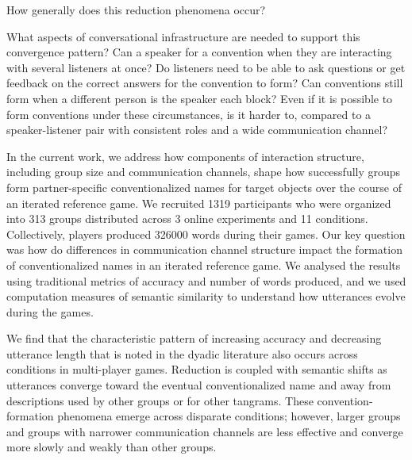 \documentclass[
  english,
  a4paper,
]{article}
\begin{document}
How generally does this reduction phenomena occur?

What aspects of conversational infrastructure are needed to support this convergence pattern? Can a speaker for a convention when they are interacting with several listeners at once? Do listeners need to be able to ask questions or get feedback on the correct answers for the convention to form? Can conventions still form when a different person is the speaker each block? Even if it is possible to form conventions under these circumstances, is it harder to, compared to a speaker-listener pair with consistent roles and a wide communication channel?

In the current work, we address how components of interaction structure, including group size and communication channels, shape how successfully groups form partner-specific conventionalized names for target objects over the course of an iterated reference game. We recruited 1319 participants who were organized into 313 groups distributed across 3 online experiments and 11 conditions. Collectively, players produced 326000 words during their games. Our key question was how do differences in communication channel structure impact the formation of conventionalized names in an iterated reference game. We analysed the results using traditional metrics of accuracy and number of words produced, and we used computation measures of semantic similarity to understand how utterances evolve during the games.

We find that the characteristic pattern of increasing accuracy and decreasing utterance length that is noted in the dyadic literature also occurs across conditions in multi-player games. Reduction is coupled with semantic shifts as utterances converge toward the eventual conventionalized name and away from descriptions used by other groups or for other tangrams. These convention-formation phenomena emerge across disparate conditions; however, larger groups and groups with narrower communication channels are less effective and converge more slowly and weakly than other groups.
\end{document}
